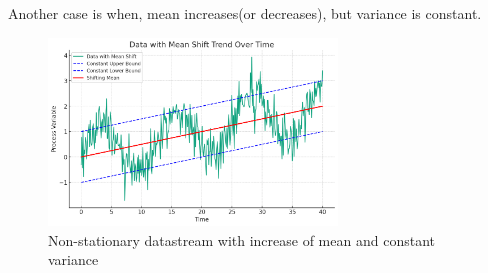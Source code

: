 \documentclass{article}
\begin{document}
Another case is when, mean increases(or decreases), but variance is constant.
\begin{figure}[h]
    \center 
    \includegraphics[width=0.685\textwidth]{meanshift.png}
    \caption{Non-stationary datastream with increase of mean and constant variance}
    \label{fig:converge-wave}
\end{figure}

\end{document}
